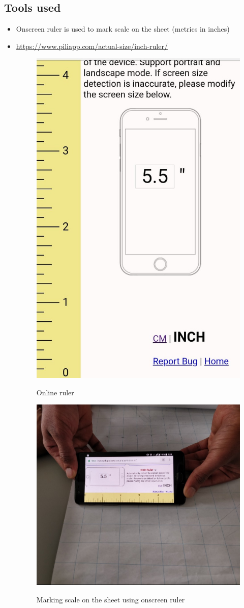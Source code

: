 \documentclass[11pt,a4paper]{article}
\begin{document}
\subsection{Tools used}
\begin{itemize}
\item Onscreen ruler is used to mark scale on the sheet (metrics in inches)
\item \url{https://www.piliapp.com/actual-size/inch-ruler/}
\begin{figure}[H]
\centering	
\includegraphics[width=0.4\linewidth]{screenshot}
\label{fig:sub1}
\caption{Online ruler}
\end{figure}

\begin{figure}[H]
\centering	
\includegraphics[width=0.7\linewidth]{measure}
\label{fig:sub1}
\caption{Marking scale on the sheet using onscreen ruler}
\end{figure}

\end{itemize}
\end{document}

